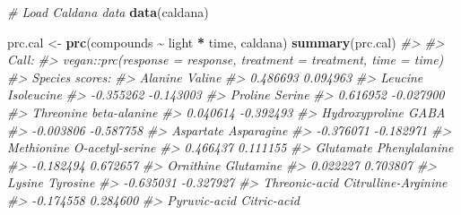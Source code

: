 \documentclass[
]{article}
\newenvironment{Shaded}{\begin{snugshade}}{\end{snugshade}}
\newcommand{\CommentTok}[1]{\textcolor[rgb]{0.56,0.35,0.01}{\textit{#1}}}
\newcommand{\FunctionTok}[1]{\textcolor[rgb]{0.13,0.29,0.53}{\textbf{#1}}}
\newcommand{\NormalTok}[1]{#1}
\newcommand{\OtherTok}[1]{\textcolor[rgb]{0.56,0.35,0.01}{#1}}
\newcommand{\SpecialCharTok}[1]{\textcolor[rgb]{0.81,0.36,0.00}{\textbf{#1}}}
\begin{document}
\begin{Shaded}
\begin{Highlighting}[]
\CommentTok{\# Load Caldana data}
\FunctionTok{data}\NormalTok{(caldana)}

\NormalTok{prc.cal }\OtherTok{\textless{}{-}} \FunctionTok{prc}\NormalTok{(compounds }\SpecialCharTok{\textasciitilde{}}\NormalTok{ light }\SpecialCharTok{*}\NormalTok{ time, caldana)}
\FunctionTok{summary}\NormalTok{(prc.cal)}
\CommentTok{\#\textgreater{} }
\CommentTok{\#\textgreater{} Call:}
\CommentTok{\#\textgreater{} vegan::prc(response = response, treatment = treatment, time = time) }
\CommentTok{\#\textgreater{} Species scores:}
\CommentTok{\#\textgreater{}                    Alanine                     Valine }
\CommentTok{\#\textgreater{}                   0.486693                   0.094963 }
\CommentTok{\#\textgreater{}                    Leucine                 Isoleucine }
\CommentTok{\#\textgreater{}                  {-}0.355262                  {-}0.143003 }
\CommentTok{\#\textgreater{}                    Proline                     Serine }
\CommentTok{\#\textgreater{}                   0.616952                  {-}0.027900 }
\CommentTok{\#\textgreater{}                  Threonine               beta{-}alanine }
\CommentTok{\#\textgreater{}                   0.040614                  {-}0.392493 }
\CommentTok{\#\textgreater{}             Hydroxyproline                       GABA }
\CommentTok{\#\textgreater{}                  {-}0.003806                  {-}0.587758 }
\CommentTok{\#\textgreater{}                  Aspartate                 Asparagine }
\CommentTok{\#\textgreater{}                  {-}0.376071                  {-}0.182971 }
\CommentTok{\#\textgreater{}                 Methionine            O{-}acetyl{-}serine }
\CommentTok{\#\textgreater{}                   0.466437                   0.111155 }
\CommentTok{\#\textgreater{}                  Glutamate              Phenylalanine }
\CommentTok{\#\textgreater{}                  {-}0.182494                   0.672657 }
\CommentTok{\#\textgreater{}                  Ornithine                  Glutamine }
\CommentTok{\#\textgreater{}                   0.022227                   0.703807 }
\CommentTok{\#\textgreater{}                     Lysine                   Tyrosine }
\CommentTok{\#\textgreater{}                  {-}0.635031                  {-}0.327927 }
\CommentTok{\#\textgreater{}              Threonic{-}acid        Citrulline{-}Arginine }
\CommentTok{\#\textgreater{}                  {-}0.174558                   0.284600 }
\CommentTok{\#\textgreater{}               Pyruvic{-}acid                Citric{-}acid }

\end{Highlighting}
\end{Shaded}
\end{document}
